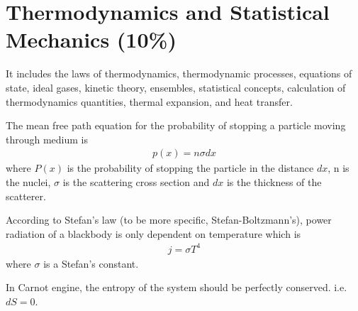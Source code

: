 
\section{Thermodynamics and Statistical Mechanics (10\%)}

It includes the laws of thermodynamics, thermodynamic processes, equations of state, ideal gases, kinetic theory, ensembles, statistical concepts, calculation of thermodynamics quantities, thermal expansion, and heat transfer.


The mean free path equation for the probability of stopping a particle moving through medium is
\begin{align}
p(x) = n \sigma dx
\end{align}
where $P(x)$ is the probability of stopping the particle in the distance $dx$, n is the nuclei, $\sigma$ is the scattering cross section and $dx$ is the thickness of the scatterer.

According to Stefan's law (to be more specific, Stefan-Boltzmann's), power radiation of a blackbody is only dependent on temperature which is
\begin{align}
j = \sigma T^{4}
\end{align}
where $\sigma$ is a Stefan's constant.

In Carnot engine, the entropy of the system should be perfectly conserved. i.e. $dS = 0$.